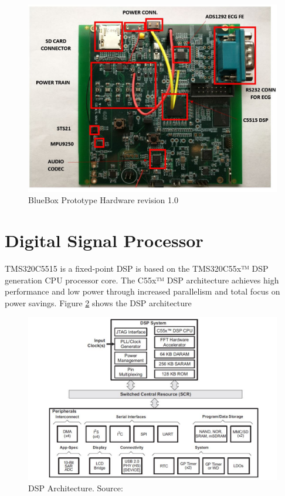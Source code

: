 \begin{figure}[h]
	\centering
	\includegraphics[scale = 0.08]{BlueBox_Hardware.jpg}
	\caption{BlueBox Prototype Hardware revision 1.0 \label{BlueBox_Hardware}}
\end{figure} 
\section{Digital Signal Processor}
TMS320C5515 is a fixed-point DSP is based on the TMS320C55x™ DSP generation CPU processor core. The C55x™ DSP architecture achieves high performance and low power through increased parallelism and total focus on power savings. Figure \ref{C5515 Architecture} shows the DSP architecture

\begin{figure}[h]
	\centering
	\includegraphics[scale = 0.75 ]{C5515_arch.JPG}
	\caption{DSP Architecture. Source:\cite{tms320c5515}\label{C5515 Architecture}}
\end{figure} 
